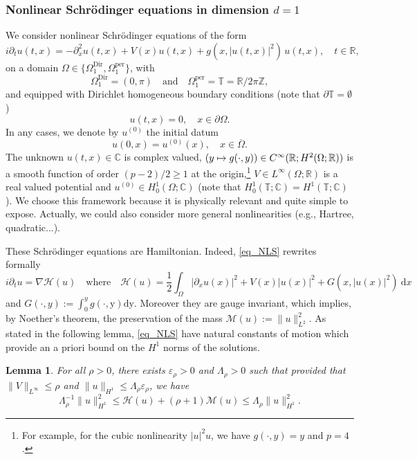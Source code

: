 \documentclass[11pt]{article}
\newcommand{\eg}{e.g.,\xspace}
\newcommand\mto{\mathchoice{\longmapsto}{\mapsto}{\mapsto}{\mapsto}}
\newtheorem{lemma}[theorem]{Lemma}
\theoremstyle{definition}
\begin{document}
\subsubsection{Nonlinear Schrödinger equations in dimension $d=1$}
\label{sub_sec_NLS}
We consider nonlinear Schrödinger equations of the form
\begin{equation}
\label{eq_NLS}
\tag{NLS}
i\partial_t u(t,x) = -\partial_x^2 u(t,x) +V(x) u(t,x) + g(x,|u(t,x)|^2)\, u(t,x), \quad t\in \mathbb{R},
\end{equation}
on a domain $\Omega \in \{ \Omega^{\mathrm{Dir}}_1, \Omega^{\mathrm{per}}_1 \}$, with
\[
\Omega^{\mathrm{Dir}}_1= (0,\pi) \quad \text{and} \quad \Omega^{\mathrm{per}}_1= \mathbb{T} = \mathbb{R}/2\pi\mathbb{Z},
\]
and equipped with Dirichlet homogeneous boundary conditions (note that $\partial \mathbb{T} = \emptyset$)
\begin{equation}
	u(t,x)= 0, \quad x\in \partial \Omega.
\end{equation}
In any cases, we denote by $u^{(0)}$ the initial datum
\[
u(0,x) = u^{(0)}(x), \quad x\in \overline{\Omega}.
\]
The unknown $u(t,x) \in \mathbb{C}$ is complex valued, $(y \mto g(\cdot,y)) \in C^\infty(\mathbb{R}; H^{2}(\Omega;\mathbb{R}))$ is a smooth function of order $(p-2)/2 \geq 1$ at the origin,\footnote{For example, for the cubic nonlinearity $|u|^2 u$, we have $g(\cdot,y)=y$ and $p=4$.} $V\in L^\infty(\Omega;\mathbb{R})$ is a real valued potential and $u^{(0)} \in H^1_0(\Omega;\mathbb{C})$ (note that $H^1_0(\mathbb{T};\mathbb{C}) = H^1(\mathbb{T};\mathbb{C})$). We choose this framework because it is physically relevant and quite simple to expose. Actually, we could also consider more general nonlinearities (\eg Hartree, quadratic...).

These Schrödinger equations are Hamiltonian. Indeed, \eqref{eq_NLS} rewrites formally
\[
i\partial_t u = \nabla \mathcal{H}(u) \quad \text{where} \quad \mathcal{H}(u) = \frac12 \int_{\Omega} |\partial_x u(x) |^2 + V(x) |u(x)|^2 + G(x,|u(x)|^2) \ \mathrm{d}x
\]
and $G(\cdot,y):= \int_0^y g(\cdot,\mathrm{y}) \mathrm{d}\mathrm{y}$. Moreover they are gauge invariant, which implies, by Noether's theorem, the preservation of the mass $
\mathcal{M}(u):= \| u \|_{L^2}^2$. As stated in the following lemma, \eqref{eq_NLS} have natural constants of motion which provide an a priori bound on the $H^1$ norms of the solutions.

\begin{lemma} \label{lemma_Lag_NLS_coer} For all $\rho>0$, there exists $\varepsilon_\rho >0$ and $\Lambda_\rho>0$ such that provided that $\| V \|_{L^\infty} \leq \rho$ and $\|u\|_{H^1} \leq \Lambda_\rho \varepsilon_\rho$, we have
\[
\Lambda_{\rho}^{-1} \| u\|_{H^1}^2 \leq \mathcal{H}(u) + (\rho+1) \mathcal{M}(u) \leq \Lambda_{\rho} \| u\|_{H^1}^2.
\]
\end{lemma}
\end{document}
